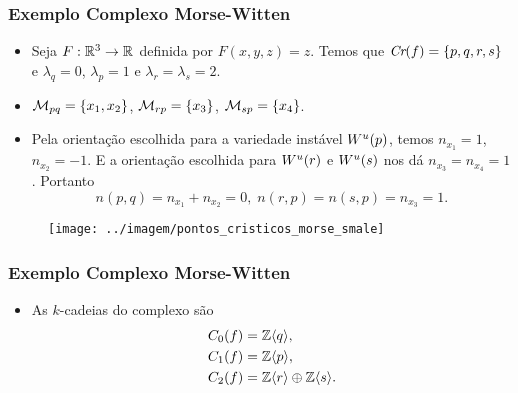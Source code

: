\documentclass{beamer}
\begin{document}
\begin{footnotesize}
	
	
	\begin{frame}
		
		\frametitle{Exemplo Complexo Morse-Witten}
		
		\begin{minipage}[t]{0.5\linewidth}
			
			\begin{itemize}
				\item Seja $F:\mathbb{R}^{3} \to \mathbb{R}^{}$ definida por $F(x, y, z) = z$. Temos que $\textit{Cr}(f) = \{p,q,r,s\}$ e $\lambda_{q} = 0$, $\lambda_{p} = 1$ e $\lambda_{r}=\lambda_{s} = 2$. 
				
				\item $\mathcal{M}_{pq}=\{x_{1}, x_{2}\}$, $\mathcal{M}_{rp} = \{ x_{3}\}$, $\mathcal{M}_{sp} = \{x_{4} \}$.
				
				\item Pela orientação escolhida para a variedade instável $W^{u}(p)$, temos $n_{x_{1}}=1$, $n_{x_{2}} = -1$. E a orientação escolhida para $W^{u}(r)$ e $W^{u}(s)$ nos dá $n_{x_{3}} =n_{x_{4}}= 1$. Portanto 
				$$
				n(p,q) = n_{x_{1}}+n_{x_{2}} = 0,\; n(r,p) = n(s,p)=n_{x_{3}}= 1. 
				$$			
			\end{itemize}
		\end{minipage}
		\hfill%
			\begin{minipage}[t]{0.4\linewidth}
				\begin{figure}
					\centering
					\textbf{}\par
					\texttt{[image: ../imagem/pontos\_cristicos\_morse\_smale]}
				\end{figure}
				
			\end{minipage}
	
	\end{frame}
	
	\begin{frame}
		\frametitle{Exemplo Complexo Morse-Witten}
		\begin{minipage}[t]{0.5\linewidth}
			\begin{itemize}
				\item As $k$-cadeias do complexo são
				$$
				\begin{aligned}
				C_{0}(f) &= \mathbb{Z}\langle q\rangle, 
				\\
				C_{1}(f) &= \mathbb{Z}\langle p\rangle,
				\\
				C_{2}(f) &= \mathbb{Z}\langle r\rangle\oplus\mathbb{Z}\langle s\rangle.
				\end{aligned}
				$$
				

\end{itemize}
\end{minipage}
\end{frame}
\end{footnotesize}
\end{document}
